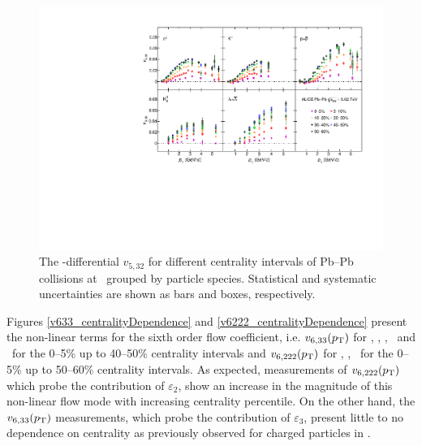 \begin{figure}[!htb]
\begin{center}
\includegraphics[scale=0.82]{figures/results/All_v523_gap00_CentDep_PID2.pdf}
\end{center}
\caption{The \pT-differential $v_{5,32}$ for different centrality intervals of Pb--Pb collisions at \sNN~grouped by particle species. Statistical and systematic uncertainties are shown as bars and boxes, respectively.}
\label{v523_centralityDependence}
\end{figure}

Figures \ref{v633_centralityDependence} and \ref{v6222_centralityDependence} present the non-linear terms for the sixth order flow coefficient, i.e. $v_{6,33}(p_{\rm{T}})$ for \pion, \kaon, \Ks, \proton~and \lambdas~for the 0--5\% up to 40--50\% centrality intervals and $v_{6,222}(p_{\rm{T}})$ for \pion, \kaon, \proton~for the 0--5\% up to 50--60\% centrality intervals. As expected, measurements of $v_{6,222}(p_{\rm{T}})$ which probe the contribution of $\varepsilon_2$, show an increase in the magnitude of this non-linear flow mode with increasing centrality percentile. On the other hand, the $v_{6,33}(p_{\rm{T}})$ measurements, which probe the contribution of $\varepsilon_3$, present little to no dependence on centrality as previously observed for charged particles in \cite{Acharya:2017zfg}. 

